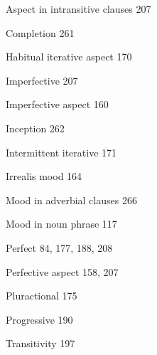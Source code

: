 \begin{multicols}{2}
\begin{styleindexii}
Aspect in intransitive clauses  207
\end{styleindexii}

\begin{styleindexii}
Completion  261
\end{styleindexii}

\begin{styleindexii}
Habitual iterative aspect  170
\end{styleindexii}

\begin{styleindexii}
Imperfective  207
\end{styleindexii}

\begin{styleindexii}
Imperfective aspect  160
\end{styleindexii}

\begin{styleindexii}
Inception  262
\end{styleindexii}

\begin{styleindexii}
Intermittent iterative  171
\end{styleindexii}

\begin{styleindexii}
Irrealis mood  164
\end{styleindexii}

\begin{styleindexii}
Mood in adverbial clauses  266
\end{styleindexii}

\begin{styleindexii}
Mood in noun phrase  117
\end{styleindexii}

\begin{styleindexii}
Perfect  84, 177, 188, 208
\end{styleindexii}

\begin{styleindexii}
Perfective aspect  158, 207
\end{styleindexii}

\begin{styleindexii}
Pluractional  175
\end{styleindexii}

\begin{styleindexii}
Progressive  190
\end{styleindexii}

\begin{styleindexi}
Transitivity  197
\end{styleindexi}


\end{multicols}
